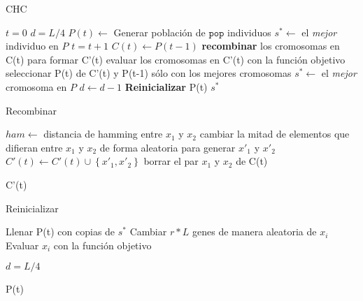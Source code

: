 \begin{algorithm}
\caption{CHC}
\label{chc}
\begin{algorithmic}[1]


\State $t=0$
\State $d=L/4$
\State $P(t) \gets$ Generar población de $\texttt{pop}$ individuos
\State $s^* \gets $ el \emph{mejor} individuo en $P$
	\State $t=t+1$
	\State $C(t) \gets P(t-1)$
	\State \textbf{recombinar} los cromosomas en C(t) para formar C'(t)
	\State evaluar los cromosomas en C'(t) con la función objetivo
	\State seleccionar P(t) de C'(t) y P(t-1) sólo con los mejores cromosomas
		\State $s^* \gets$ el \emph{mejor} cromosoma en $P$
	\EndIf
		\State $d \gets d - 1$
	\EndIf
		\State \textbf{Reinicializar} P(t)
	\EndIf
\EndWhile
\State \Return $s^*$

\end{algorithmic}
\end{algorithm}

\begin{algorithm}
\caption{Recombinar}
\label{recombinar}
\begin{algorithmic}


	\State $ham \gets$ distancia de hamming entre $x_1$ y $x_2$
		\State cambiar la mitad de elementos que difieran entre $x_1$ y $x_2$ de forma aleatoria para generar $x'_1$ y $x'_2$
		\State $C'(t) \gets C'(t) \cup \left\{x'_1,x'_2\right\}$
	\Else
		\State borrar el par $x_1$ y $x_2$ de C(t)
	\EndIf
\EndFor

\State \Return C'(t)

\end{algorithmic}
\end{algorithm}

\begin{algorithm}
\caption{Reinicializar}
\label{Reinicializar}
\begin{algorithmic}


\State Llenar P(t) con copias de $s^*$
	\State Cambiar $r*L$ genes de manera aleatoria de $x_i$
	\State Evaluar $x_i$ con la función objetivo
\EndFor

\State $d=L/4$

\State \Return P(t)

\end{algorithmic}
\end{algorithm}

